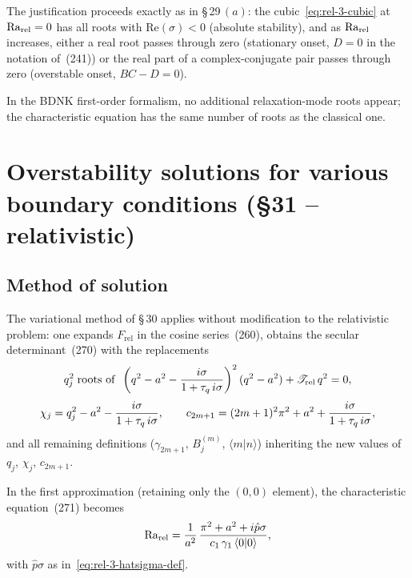 The justification proceeds exactly as in \S\,29\,$(a)$: the
cubic~\eqref{eq:rel-3-cubic} at $\mathrm{Ra}_{\mathrm{rel}} = 0$ has all roots with
$\mathrm{Re}(\sigma)<0$ (absolute stability), and as $\mathrm{Ra}_{\mathrm{rel}}$
increases, either a real root passes through zero (stationary onset,
$D=0$ in the notation of~(241)) or the real part of a
complex-conjugate pair passes through zero (overstable onset,
$BC-D=0$).

In the BDNK first-order formalism, no additional relaxation-mode
roots appear; the characteristic equation has the same number of
roots as the classical one.


\section{Overstability solutions for various boundary conditions
  (\S31 -- relativistic)}\label{sec:rel-3-31}

\subsection{Method of solution}

The variational method of \S\,30 applies without modification to the
relativistic problem: one expands $F_{\mathrm{rel}}$ in the cosine
series~(260), obtains the secular determinant~(270) with the
replacements
\begin{equation}\label{eq:rel-3-redef-q}
  q_{j}^{2} \;\text{roots of}\;\;
  \left(q^{2}-a^{2}-\frac{i\sigma}{1+\tau_{q}\,i\sigma}\right)^{2}
  (q^{2}-a^{2})
  + \mathscr{T}_{\mathrm{rel}}\,q^{2} = 0,
\end{equation}
\begin{equation}\label{eq:rel-3-redef-chi}
  \chi_{j} = q_{j}^{2} - a^{2} - \frac{i\sigma}{1+\tau_{q}\,i\sigma},
  \qquad
  c_{2m+1} = (2m+1)^{2}\pi^{2} + a^{2}
    + \frac{i\sigma}{1+\tau_{q}\,i\sigma},
\end{equation}
and all remaining definitions ($\gamma_{2m+1}$, $B_{j}^{(m)}$,
$\langle m|n\rangle$) inheriting the new values of $q_{j}$, $\chi_{j}$,
$c_{2m+1}$.

In the first approximation (retaining only the $(0,0)$ element), the
characteristic equation~(271) becomes
\begin{equation}\label{eq:rel-3-R-approx}
  \mathrm{Ra}_{\mathrm{rel}}
  = \frac{1}{a^{2}}\,
    \frac{\pi^{2}+a^{2}+i\hat{p}\sigma}
         {c_{1}\,\gamma_{1}\,\langle 0|0\rangle},
\end{equation}
with $\hat{p}\sigma$ as in~\eqref{eq:rel-3-hatsigma-def}.

